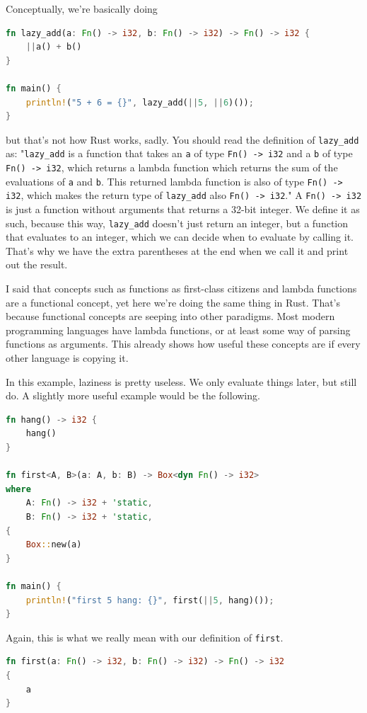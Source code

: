\documentclass[11pt]{article}
\begin{document}
Conceptually, we're basically doing
\begin{lstlisting}[language=Rust]
fn lazy_add(a: Fn() -> i32, b: Fn() -> i32) -> Fn() -> i32 {
    ||a() + b()
}

fn main() {
    println!("5 + 6 = {}", lazy_add(||5, ||6)());
}
\end{lstlisting}

but that's not how Rust works, sadly. You should read the definition of
\texttt{lazy\_add} as: "\texttt{lazy\_add} is a function that takes an
\texttt{a} of type \texttt{Fn() -> i32} and a \texttt{b} of type \texttt{Fn()
-> i32}, which returns a lambda function which returns the sum of the
evaluations of \texttt{a} and \texttt{b}. This returned lambda function is also
of type \texttt{Fn() -> i32}, which makes the return type of \texttt{lazy\_add}
also \texttt{Fn() -> i32}." A \texttt{Fn() -> i32} is just a function without
arguments that returns a 32-bit integer. We define it as such, because this
way, \texttt{lazy\_add} doesn't just return an integer, but a function that
evaluates to an integer, which we can decide when to evaluate by calling it.
That's why we have the extra parentheses at the end when we call it and print
out the result.

I said that concepts such as functions as first-class citizens and lambda
functions are a functional concept, yet here we're doing the same thing in
Rust. That's because functional concepts are seeping into other paradigms. Most
modern programming languages have lambda functions, or at least some way of
parsing functions as arguments. This already shows how useful these concepts
are if every other language is copying it.

In this example, laziness is pretty useless. We only evaluate things later, but
still do. A slightly more useful example would be the following.
\begin{lstlisting}[language=Rust]
fn hang() -> i32 {
    hang()
}

fn first<A, B>(a: A, b: B) -> Box<dyn Fn() -> i32>
where
    A: Fn() -> i32 + 'static,
    B: Fn() -> i32 + 'static,
{
    Box::new(a)
}

fn main() {
    println!("first 5 hang: {}", first(||5, hang)());
}
\end{lstlisting}
Again, this is what we really mean with our definition of \texttt{first}.
\begin{lstlisting}[language=Rust]
fn first(a: Fn() -> i32, b: Fn() -> i32) -> Fn() -> i32
{
    a
}
\end{lstlisting}
\end{document}
